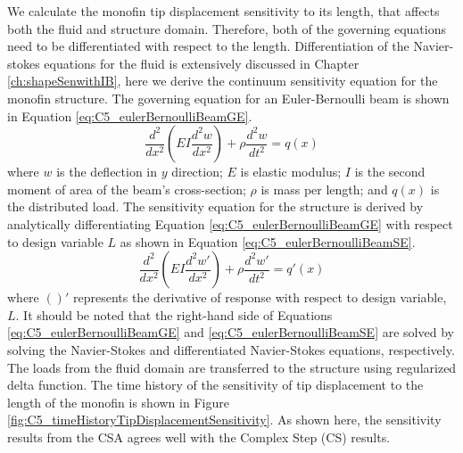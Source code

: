 %
We calculate the monofin tip displacement sensitivity to its length, that affects both the fluid and structure domain. Therefore, both of the governing equations need to be differentiated with respect to the length. Differentiation of the Navier-stokes equations for the fluid is extensively discussed in Chapter \ref{ch:shapeSenwithIB}, here we derive the continuum sensitivity equation for the monofin structure. The governing equation for an Euler-Bernoulli beam is shown in Equation \eqref{eq:C5_eulerBernoulliBeamGE}.
%
\begin{equation}\label{eq:C5_eulerBernoulliBeamGE}
	\frac{d^2}{dx^2}
	\left( EI \frac{d^2 w}{dx^2} \right) + \rho \frac{d^2 w}{dt^2} = q(x)
\end{equation}
%
where $w$ is the deflection in $y$ direction; $E$ is elastic modulus; $I$ is the second moment of area of the beam's cross-section; $\rho$ is mass per length; and $q(x)$ is the distributed load. The sensitivity equation for the structure is derived by analytically differentiating Equation \eqref{eq:C5_eulerBernoulliBeamGE} with respect to design variable $L$ as shown in Equation \eqref{eq:C5_eulerBernoulliBeamSE}.
%
\begin{equation}\label{eq:C5_eulerBernoulliBeamSE}
	\frac{d^2}{dx^2}
	\left( EI \frac{d^2 w'}{dx^2} \right) + \rho \frac{d^2 w'}{dt^2} = q'(x)
\end{equation}
%
where $( )'$ represents the derivative of response with respect to design variable, $L$. It should be noted that the right-hand side of Equations \eqref{eq:C5_eulerBernoulliBeamGE} and \eqref{eq:C5_eulerBernoulliBeamSE} are solved by solving the Navier-Stokes and differentiated Navier-Stokes equations, respectively. The loads from the fluid domain are transferred to the structure using regularized delta function. The time history of the sensitivity of tip displacement to the length of the monofin is shown in Figure \ref{fig:C5_timeHistoryTipDisplacementSensitivity}. As shown here, the sensitivity results from the CSA agrees well with the Complex Step (CS) results.
%
